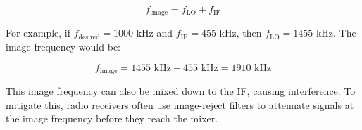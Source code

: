 \[
f_{\text{image}} = f_{\text{LO}} \pm f_{\text{IF}}
\]

For example, if \( f_{\text{desired}} = 1000 \) kHz and \( f_{\text{IF}} = 455 \) kHz, then \( f_{\text{LO}} = 1455 \) kHz. The image frequency would be:

\[
f_{\text{image}} = 1455 \text{ kHz} + 455 \text{ kHz} = 1910 \text{ kHz}
\]

This image frequency can also be mixed down to the IF, causing interference. To mitigate this, radio receivers often use image-reject filters to attenuate signals at the image frequency before they reach the mixer.

